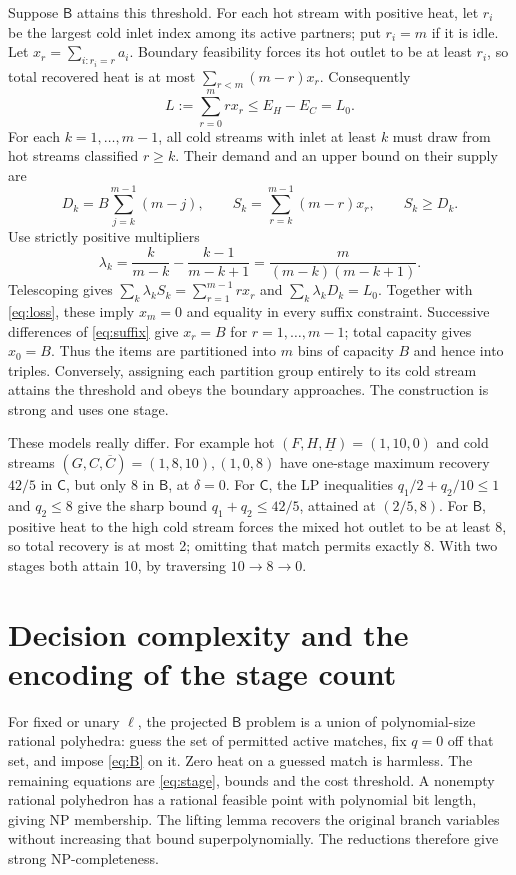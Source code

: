 \documentclass[11pt,a4paper]{report}
\newcommand{\CC}{\mathsf{C}}
\newcommand{\BB}{\mathsf{B}}
\begin{document}
Suppose $\BB$ attains this threshold. For each hot stream with positive heat,
let $r_i$ be the largest cold inlet index among its active partners; put
$r_i=m$ if it is idle. Let $x_r=\sum_{i:r_i=r}a_i$. Boundary feasibility
forces its hot outlet to be at least $r_i$, so total recovered heat is at
most $\sum_{r<m}(m-r)x_r$. Consequently
\begin{equation}\label{eq:loss}
 L:=\sum_{r=0}^m r x_r\leq E_H-E_C=L_0.
\end{equation}
For each $k=1,\ldots,m-1$, all cold streams with inlet at least $k$ must draw
from hot streams classified $r\geq k$. Their demand and an upper bound on
their supply are
\begin{equation}\label{eq:suffix}
 D_k=B\sum_{j=k}^{m-1}(m-j),\qquad
 S_k=\sum_{r=k}^{m-1}(m-r)x_r,\qquad S_k\geq D_k.
\end{equation}
Use strictly positive multipliers
\begin{equation}
 \lambda_k=\frac{k}{m-k}-\frac{k-1}{m-k+1}
           =\frac{m}{(m-k)(m-k+1)}.
\end{equation}
Telescoping gives
$\sum_k\lambda_k S_k=\sum_{r=1}^{m-1}r x_r$ and
$\sum_k\lambda_k D_k=L_0$. Together with \eqref{eq:loss}, these imply
$x_m=0$ and equality in every suffix constraint. Successive differences of
\eqref{eq:suffix} give $x_r=B$ for $r=1,\ldots,m-1$; total capacity gives
$x_0=B$. Thus the items are partitioned into $m$ bins of capacity $B$ and
hence into triples. Conversely, assigning each partition group entirely to
its cold stream attains the threshold and obeys the boundary approaches.
The construction is strong and uses one stage.

These models really differ. For example hot $(F,H,\underline H)=(1,10,0)$
and cold streams $(G,C,\overline C)=(1,8,10),(1,0,8)$ have one-stage
maximum recovery $42/5$ in $\CC$, but only 8 in $\BB$, at $\delta=0$.
For $\CC$, the LP inequalities $q_1/2+q_2/10\leq1$ and $q_2\leq8$ give
the sharp bound $q_1+q_2\leq42/5$, attained at $(2/5,8)$.
For $\BB$, positive heat to the high cold stream forces the mixed hot
outlet to be at least 8, so total recovery is at most 2; omitting that match
permits exactly 8. With two stages both attain 10, by traversing $10\to8\to0$.

\section{Decision complexity and the encoding of the stage count}
For fixed or unary $\ell$, the projected $\BB$ problem is a union of
polynomial-size rational polyhedra: guess the set of permitted active matches,
fix $q=0$ off that set, and impose \eqref{eq:B} on it. Zero heat on a guessed
match is harmless. The remaining equations are \eqref{eq:stage}, bounds and
the cost threshold. A nonempty rational polyhedron has a rational feasible
point with polynomial bit length, giving NP membership. The lifting lemma
recovers the original branch variables without increasing that bound
superpolynomially. The reductions therefore give strong NP-completeness.
\end{document}
